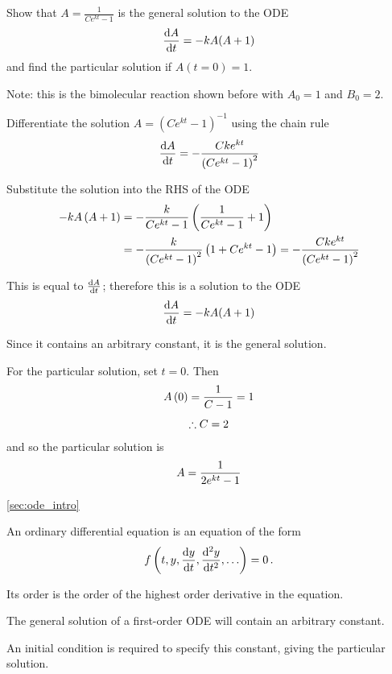 \goodbreak
\begin{example}[Lecture]
\label{ex:612}

Show that $A=\frac{1}{C{e}^{kt}-1} $ is the general solution to the ODE
\[
\frac{{\rm d} A}{{\rm d} t}=-kA(A+1)
\]
and find the particular solution if $A(t=0)=1$.

Note: this is the bimolecular reaction shown before with ${A}_{0}=1$ and ${B}_{0}=2$.

\end{example}
\begin{solution}

Differentiate the solution $A={\left(C{e}^{kt}-1\right)}^{-1}$ using the chain rule
\[
\frac{{\rm d} A}{{\rm d} t}=-\frac{Ck{e}^{kt}}{{\left(C{e}^{kt}-1\right)}^{2}}
\]


Substitute the solution into the RHS of the ODE
\[
\begin{aligned}
-kA\left(A+1\right)&=-\frac{k}{C{e}^{kt}-1}\left(\frac{1}{C{e}^{kt}-1}+1\right)\\
&=-\frac{k}{{\left(C{e}^{kt}-1\right)}^{2}}\left(1+C{e}^{kt}-1\right)=-\frac{Ck{e}^{kt}}{{\left(C{e}^{kt}-1\right)}^{2}}
\end{aligned}
\]

This is equal to $\frac{{\rm d} A}{{\rm d} t}$; therefore this is a solution to the ODE
\[
\frac{{\rm d} A}{{\rm d} t}=-kA(A+1)
\]

Since it contains an arbitrary constant, it is the general solution.


For the particular solution, set $t=0$. Then
\[
\begin{gathered}
A\left(0\right)=\frac{1}{C-1}=1
\\[4pt]
\therefore C=2
\end{gathered}
\]
and so the particular solution is
\[
A=\frac{1}{2{e}^{kt}-1}
\]

\end{solution}


\begin{recap}{\ref{sec:ode_intro}}

\item An ordinary differential equation is an equation of the form
\[
f\left(t,y,\frac{{\rm d} y}{{\rm d} t},\frac{{\rm d} ^2y}{{\rm d} t^2},\ldots \right)=0 \, .
\]

\item Its order is the order of the highest order derivative in the equation.

\item The general solution of a first-order ODE will contain an arbitrary constant.

\item An initial condition is required to specify this constant, giving the particular solution.

\end{recap}

